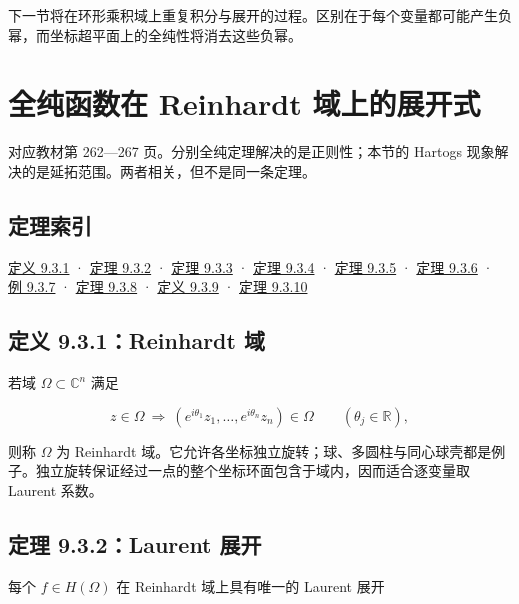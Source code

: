 \documentclass[11pt,a4paper]{article}
\begin{document}
下一节将在环形乘积域上重复积分与展开的过程。区别在于每个变量都可能产生负幂，而坐标超平面上的全纯性将消去这些负幂。

\section{全纯函数在 Reinhardt 域上的展开式}
\hypertarget{chapter9-part-3}{}
\par
对应教材第 262---267 页。分别全纯定理解决的是正则性；本节的 Hartogs
现象解决的是延拓范围。两者相关，但不是同一条定理。

\subsection*{定理索引}\label{ch09-s3-heading-1}

\hyperref[ch09-s3-heading-2]{定义 9.3.1} · \hyperref[ch09-s3-heading-3]{定理 9.3.2} ·
\hyperref[ch09-s3-heading-4]{定理 9.3.3} · \hyperref[ch09-s3-heading-5]{定理 9.3.4} ·
\hyperref[ch09-s3-heading-5]{定理 9.3.5} · \hyperref[ch09-s3-heading-6]{定理 9.3.6} ·
\hyperref[ch09-s3-heading-7]{例 9.3.7} · \hyperref[ch09-s3-heading-8]{定理 9.3.8} ·
\hyperref[ch09-s3-heading-9]{定义 9.3.9} · \hyperref[ch09-s3-heading-10]{定理 9.3.10}

\subsection{定义 9.3.1：Reinhardt 域}\label{ch09-s3-heading-2}

若域 \(\Omega\subset\mathbb C^n\) 满足

\[
z\in\Omega\ \Longrightarrow\
(e^{i\theta_1}z_1,\ldots,e^{i\theta_n}z_n)\in\Omega
\qquad(\theta_j\in\mathbb R),
\]

则称 \(\Omega\) 为 Reinhardt
域。它允许各坐标独立旋转；球、多圆柱与同心球壳都是例子。独立旋转保证经过一点的整个坐标环面包含于域内，因而适合逐变量取
Laurent 系数。

\subsection{定理 9.3.2：Laurent 展开}\label{ch09-s3-heading-3}

每个 \(f\in H(\Omega)\) 在 Reinhardt 域上具有唯一的 Laurent 展开
\end{document}
